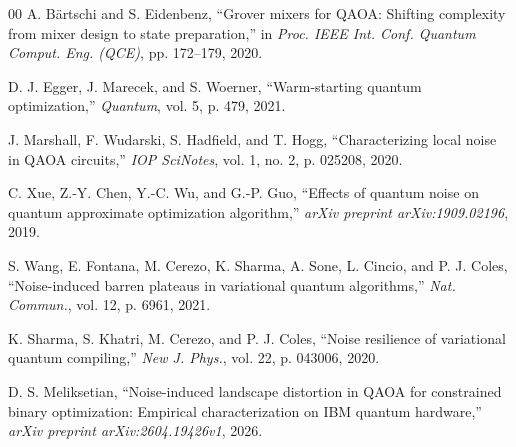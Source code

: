 \documentclass[conference]{IEEEtran}
\begin{document}
\begin{thebibliography}{00}
A. Bärtschi and S. Eidenbenz,
``Grover mixers for QAOA: Shifting complexity from mixer design to
state preparation,''
in \textit{Proc. IEEE Int. Conf. Quantum Comput. Eng. (QCE)},
pp. 172--179, 2020.

D. J. Egger, J. Marecek, and S. Woerner,
``Warm-starting quantum optimization,''
\textit{Quantum}, vol. 5, p. 479, 2021.

J. Marshall, F. Wudarski, S. Hadfield, and T. Hogg,
``Characterizing local noise in QAOA circuits,''
\textit{IOP SciNotes}, vol. 1, no. 2, p. 025208, 2020.

C. Xue, Z.-Y. Chen, Y.-C. Wu, and G.-P. Guo,
``Effects of quantum noise on quantum approximate optimization algorithm,''
\textit{arXiv preprint arXiv:1909.02196}, 2019.

S. Wang, E. Fontana, M. Cerezo, K. Sharma, A. Sone, L. Cincio, and P. J. Coles,
``Noise-induced barren plateaus in variational quantum algorithms,''
\textit{Nat. Commun.}, vol. 12, p. 6961, 2021.

K. Sharma, S. Khatri, M. Cerezo, and P. J. Coles,
``Noise resilience of variational quantum compiling,''
\textit{New J. Phys.}, vol. 22, p. 043006, 2020.

D. S. Meliksetian,
``Noise-induced landscape distortion in QAOA for constrained binary
optimization: Empirical characterization on IBM quantum hardware,''
\textit{arXiv preprint arXiv:2604.19426v1}, 2026.

\end{thebibliography}
\end{document}
